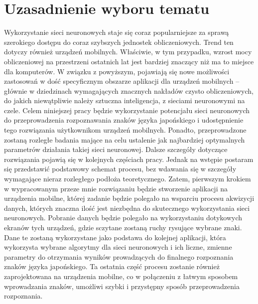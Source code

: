\section{Uzasadnienie wyboru tematu}
\iffalse
W tym podrozdziale należy szczegółowo uzasadnić dlaczego wybrany został taki a~nie inny temat pracy. Trzeba przede wszystkim zaprezentować aktualny stan wiedzy w~danej dziedzinie. Oznacza to konieczność omówienia książek (ew. artykułów naukowych bądź dokumentacji technicznej) z~których będzie się korzystać w~trakcie rozprawy. Następnie należy wskazać -- tym razem już konkretnie -- co nowego zamierza się zrobić. Podstawowymi celami tego podrozdziału jest wprowadzenie czytelnika w~aktualny stand danej dziedziny i~przekonanie go, że naprawdę warto zajmować się podjętym tematem.

{\color{red} Tutaj niestety będę potrzebował więcej czasu aby odświeżyć znajomość literatury, gdyż przez ten okres czasu przestałem być na bieżąco.}
\fi

Wykorzystanie sieci neuronowych staje się coraz popularniejsze za sprawą szerokiego dostępu do coraz szybszych jednostek obliczeniowych. Trend ten dotyczy również urządzeń mobilnych. Właściwie, w tym przypadku, wzrost mocy obliczeniowej na przestrzeni ostatnich lat jest bardziej znaczący niż ma to miejsce dla komputerów. W związku z powyższym, pojawiają się nowe możliwości zastosowań w dość specyficznym obszarze aplikacji dla urządzeń mobilnych -- głównie w dziedzinach wymagających znacznych nakładów czysto obliczeniowych, do jakich niewątpliwie należy sztuczna inteligencja, z sieciami neuronowymi na czele. Celem niniejszej pracy będzie wykorzystanie potencjału sieci neuronowych do przeprowadzenia rozpoznawania znaków języka japońskiego i udostępnienie tego rozwiązania użytkownikom urządzeń mobilnych. Ponadto, przeprowadzone zostaną rozległe badania mające na celu ustalenie jak najbardziej optymalnych parametrów działania takiej sieci neuronowej. Dalsze szczegóły dotyczące rozwiązania pojawią się w kolejnych częściach pracy. Jednak na wstępie postaram się przedstawić podstawowy schemat procesu, bez wdawania się w szczegóły wymagające nieraz rozległego podłoża teoretycznego. Zatem, pierwszym krokiem w wypracowanym przeze mnie rozwiązaniu będzie stworzenie aplikacji na urządzenia mobilne, której zadanie będzie polegało na wsparciu procesu akwizycji danych, których znaczna ilość jest niezbędna do skutecznego wykorzystania sieci neuronowych. Pobranie danych będzie polegało na wykorzystaniu dotykowych ekranów tych urządzeń, gdzie sczytane zostaną ruchy rysujące wybrane znaki. Dane te zostaną wykorzystane jako podstawa do kolejnej aplikacji, która wykorzysta wybrane algorytmy dla sieci neuronowych i ich liczne, zmienne parametry do otrzymania wyników prowadzących do finalnego rozpoznania znaków języka japońskiego. Ta ostatnia część procesu zostanie również zaprojektowana na urządzenia mobilne, co w połączeniu z łatwym sposobem wprowadzania znaków, umożliwi szybki i przystępny sposób przeprowadzenia rozpoznania.

